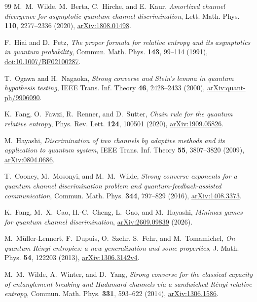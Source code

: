 \documentclass[11pt,letterpaper]{article}
\numberwithin{equation}{section}
\begin{document}
\begingroup
\small
\begin{thebibliography}{99}
\setlength{\itemsep}{1pt}
\setlength{\parskip}{0pt}
M.~M.~Wilde, M.~Berta, C.~Hirche, and E.~Kaur,
\emph{Amortized channel divergence for asymptotic quantum channel discrimination},
Lett. Math. Phys. \textbf{110}, 2277--2336 (2020),
\href{https://arxiv.org/abs/1808.01498}{arXiv:1808.01498}.

F.~Hiai and D.~Petz,
\emph{The proper formula for relative entropy and its asymptotics in quantum probability},
Commun. Math. Phys. \textbf{143}, 99--114 (1991),
\href{https://doi.org/10.1007/BF02100287}{doi:10.1007/BF02100287}.

T.~Ogawa and H.~Nagaoka,
\emph{Strong converse and Stein's lemma in quantum hypothesis testing},
IEEE Trans. Inf. Theory \textbf{46}, 2428--2433 (2000),
\href{https://arxiv.org/abs/quant-ph/9906090}{arXiv:quant-ph/9906090}.

K.~Fang, O.~Fawzi, R.~Renner, and D.~Sutter,
\emph{Chain rule for the quantum relative entropy},
Phys. Rev. Lett. \textbf{124}, 100501 (2020),
\href{https://arxiv.org/abs/1909.05826}{arXiv:1909.05826}.

M.~Hayashi,
\emph{Discrimination of two channels by adaptive methods and its application to quantum system},
IEEE Trans. Inf. Theory \textbf{55}, 3807--3820 (2009),
\href{https://arxiv.org/abs/0804.0686}{arXiv:0804.0686}.

T.~Cooney, M.~Mosonyi, and M.~M.~Wilde,
\emph{Strong converse exponents for a quantum channel discrimination problem and quantum-feedback-assisted communication},
Commun. Math. Phys. \textbf{344}, 797--829 (2016),
\href{https://arxiv.org/abs/1408.3373}{arXiv:1408.3373}.

K.~Fang, M.~X.~Cao, H.-C.~Cheng, L.~Gao, and M.~Hayashi,
\emph{Minimax games for quantum channel discrimination},
\href{https://arxiv.org/abs/2609.09839}{arXiv:2609.09839} (2026).

M.~M\"uller-Lennert, F.~Dupuis, O.~Szehr, S.~Fehr, and M.~Tomamichel,
\emph{On quantum R\'enyi entropies: a new generalization and some properties},
J. Math. Phys. \textbf{54}, 122203 (2013),
\href{https://arxiv.org/abs/1306.3142v4}{arXiv:1306.3142v4}.

M.~M.~Wilde, A.~Winter, and D.~Yang,
\emph{Strong converse for the classical capacity of entanglement-breaking and Hadamard channels via a sandwiched R\'enyi relative entropy},
Commun. Math. Phys. \textbf{331}, 593--622 (2014),
\href{https://arxiv.org/abs/1306.1586}{arXiv:1306.1586}.


\end{thebibliography}
\end{document}
